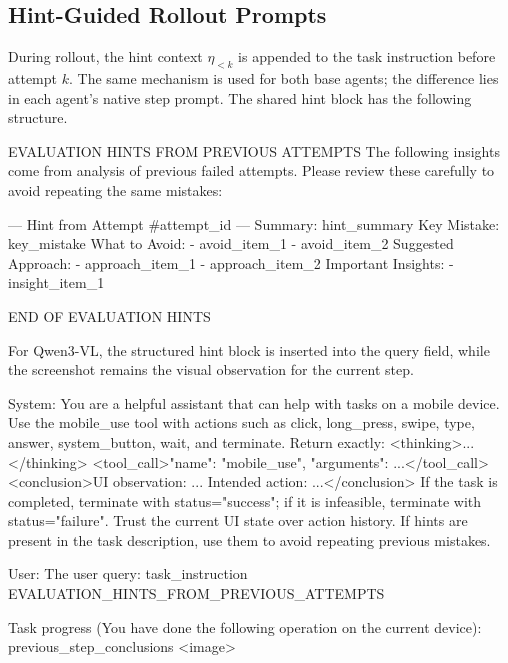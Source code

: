 \subsection{Hint-Guided Rollout Prompts}
\label{sec:rollout_prompts}

During \hifpo rollout, the hint context $\eta_{<k}$ is appended to the task instruction before attempt $k$. The same mechanism is used for both base agents; the difference lies in each agent's native step prompt. The shared hint block has the following structure.

\begin{promptlistingbox}
EVALUATION HINTS FROM PREVIOUS ATTEMPTS
The following insights come from analysis of previous failed attempts.
Please review these carefully to avoid repeating the same mistakes:

--- Hint from Attempt #{attempt_id} ---
Summary: {hint_summary}
Key Mistake: {key_mistake}
What to Avoid:
  - {avoid_item_1}
  - {avoid_item_2}
Suggested Approach:
  - {approach_item_1}
  - {approach_item_2}
Important Insights:
  - {insight_item_1}

END OF EVALUATION HINTS
\end{promptlistingbox}

For Qwen3-VL, the structured hint block is inserted into the query field, while the screenshot remains the visual observation for the current step.

\begin{promptlistingbox}
System:
You are a helpful assistant that can help with tasks on a mobile device.
Use the mobile_use tool with actions such as click, long_press, swipe,
type, answer, system_button, wait, and terminate.
Return exactly:
  <thinking>...</thinking>
  <tool_call>{"name": "mobile_use", "arguments": {...}}</tool_call>
  <conclusion>UI observation: ... Intended action: ...</conclusion>
If the task is completed, terminate with status="success"; if it is
infeasible, terminate with status="failure". Trust the current UI state
over action history. If hints are present in the task description, use
them to avoid repeating previous mistakes.

User:
The user query: {task_instruction}
{EVALUATION_HINTS_FROM_PREVIOUS_ATTEMPTS}

Task progress (You have done the following operation on the current
device):
{previous_step_conclusions}
<image>
\end{promptlistingbox}

